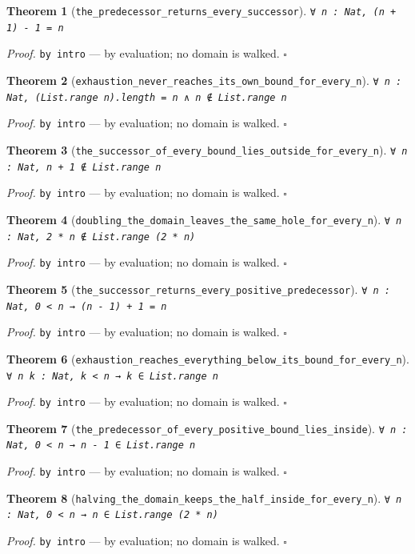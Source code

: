 \documentclass[11pt]{article}
\newtheorem{theorem}{Theorem}[section]
\begin{document}
\begin{theorem}[\texttt{the\_predecessor\_returns\_every\_successor}]
\texttt{∀ n : Nat, (n + 1) - 1 = n}
\end{theorem}
\noindent\emph{Proof.} \texttt{by
  intro} --- by evaluation; no domain is walked. \hfill$\square$

\begin{theorem}[\texttt{exhaustion\_never\_reaches\_its\_own\_bound\_for\_every\_n}]
\texttt{∀ n : Nat, (List.range n).length = n ∧ n ∉ List.range n}
\end{theorem}
\noindent\emph{Proof.} \texttt{by
  intro} --- by evaluation; no domain is walked. \hfill$\square$

\begin{theorem}[\texttt{the\_successor\_of\_every\_bound\_lies\_outside\_for\_every\_n}]
\texttt{∀ n : Nat, n + 1 ∉ List.range n}
\end{theorem}
\noindent\emph{Proof.} \texttt{by
  intro} --- by evaluation; no domain is walked. \hfill$\square$

\begin{theorem}[\texttt{doubling\_the\_domain\_leaves\_the\_same\_hole\_for\_every\_n}]
\texttt{∀ n : Nat, 2 * n ∉ List.range (2 * n)}
\end{theorem}
\noindent\emph{Proof.} \texttt{by
  intro} --- by evaluation; no domain is walked. \hfill$\square$

\begin{theorem}[\texttt{the\_successor\_returns\_every\_positive\_predecessor}]
\texttt{∀ n : Nat, 0 < n → (n - 1) + 1 = n}
\end{theorem}
\noindent\emph{Proof.} \texttt{by
  intro} --- by evaluation; no domain is walked. \hfill$\square$

\begin{theorem}[\texttt{exhaustion\_reaches\_everything\_below\_its\_bound\_for\_every\_n}]
\texttt{∀ n k : Nat, k < n → k ∈ List.range n}
\end{theorem}
\noindent\emph{Proof.} \texttt{by
  intro} --- by evaluation; no domain is walked. \hfill$\square$

\begin{theorem}[\texttt{the\_predecessor\_of\_every\_positive\_bound\_lies\_inside}]
\texttt{∀ n : Nat, 0 < n → n - 1 ∈ List.range n}
\end{theorem}
\noindent\emph{Proof.} \texttt{by
  intro} --- by evaluation; no domain is walked. \hfill$\square$

\begin{theorem}[\texttt{halving\_the\_domain\_keeps\_the\_half\_inside\_for\_every\_n}]
\texttt{∀ n : Nat, 0 < n → n ∈ List.range (2 * n)}
\end{theorem}
\noindent\emph{Proof.} \texttt{by
  intro} --- by evaluation; no domain is walked. \hfill$\square$
\end{document}
